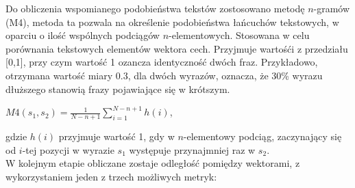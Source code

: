 \documentclass{classrep}
\begin{document}
Do obliczenia wspomianego podobieństwa tekstów zostosowano metodę \(n\)-gramów (M4), metoda ta pozwala na określenie podobieństwa łańcuchów tekstowych, w oparciu o ilość wspólnych podciągów \(n\)-elementowych. Stosowana w celu porównania tekstowych elementów wektora cech. 
Przyjmuje wartośći z przedziału [0,1], przy czym wartość 1 ozancza identyczność dwóch fraz. Przykładowo, otrzymana wartość miary 0.3, dla dwóch wyrazów, oznacza, że 30\% wyrazu dłuższego stanowią frazy pojawiające się w krótszym. 
  \begin{center}
    $M4(s_1, s_2) = \frac{1}{N-n+1} \sum_{i=1}^{N-n+1} h(i)$,\\
  \end{center}
  gdzie \(h(i)\) przyjmuje wartość 1, gdy w \(n\)-elementowy podciąg, zaczynający się od \(i\)-tej pozycji w wyrazie \(s_1\) występuje przynajmniej raz w \(s_2\). \\


W kolejnym etapie obliczane zostaje odległość pomiędzy wektorami, z wykorzystaniem
jeden z trzech możliwych metryk: \\

\end{document}

